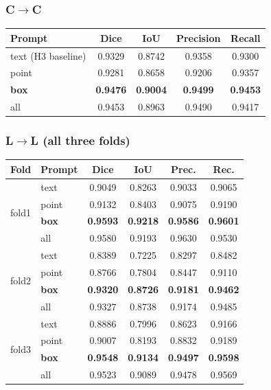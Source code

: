 \documentclass[11pt, a4paper]{article}
\begin{document}
\subsubsection{C$\to$C}
\begin{center}
\begin{tabular}{lcccc}
\toprule
\textbf{Prompt} & \textbf{Dice} & \textbf{IoU} & \textbf{Precision} & \textbf{Recall} \\
\midrule
text (H3 baseline) & 0.9329 & 0.8742 & 0.9358 & 0.9300 \\
point              & 0.9281 & 0.8658 & 0.9206 & 0.9357 \\
\textbf{box}       & \textcolor{sota}{\textbf{0.9476}} & \textbf{0.9004} & \textbf{0.9499} & \textbf{0.9453} \\
all                & 0.9453 & 0.8963 & 0.9490 & 0.9417 \\
\bottomrule
\end{tabular}
\end{center}

\subsubsection{L$\to$L (all three folds)}
\begin{center}
\begin{tabular}{llcccc}
\toprule
\textbf{Fold} & \textbf{Prompt} & \textbf{Dice} & \textbf{IoU} & \textbf{Prec.} & \textbf{Rec.} \\
\midrule
\multirow{4}{*}{fold1}
  & text  & 0.9049 & 0.8263 & 0.9033 & 0.9065 \\
  & point & 0.9132 & 0.8403 & 0.9075 & 0.9190 \\
  & \textbf{box} & \textcolor{sota}{\textbf{0.9593}} & \textbf{0.9218} & \textbf{0.9586} & \textbf{0.9601} \\
  & all   & 0.9580 & 0.9193 & 0.9630 & 0.9530 \\
\midrule
\multirow{4}{*}{fold2}
  & text  & 0.8389 & 0.7225 & 0.8297 & 0.8482 \\
  & point & 0.8766 & 0.7804 & 0.8447 & 0.9110 \\
  & \textbf{box} & \textcolor{sota}{\textbf{0.9320}} & \textbf{0.8726} & \textbf{0.9181} & \textbf{0.9462} \\
  & all   & 0.9327 & 0.8738 & 0.9174 & 0.9485 \\
\midrule
\multirow{4}{*}{fold3}
  & text  & 0.8886 & 0.7996 & 0.8623 & 0.9166 \\
  & point & 0.9007 & 0.8193 & 0.8832 & 0.9189 \\
  & \textbf{box} & \textcolor{sota}{\textbf{0.9548}} & \textbf{0.9134} & \textbf{0.9497} & \textbf{0.9598} \\
  & all   & 0.9523 & 0.9089 & 0.9478 & 0.9569 \\
\bottomrule
\end{tabular}
\end{center}
\end{document}
